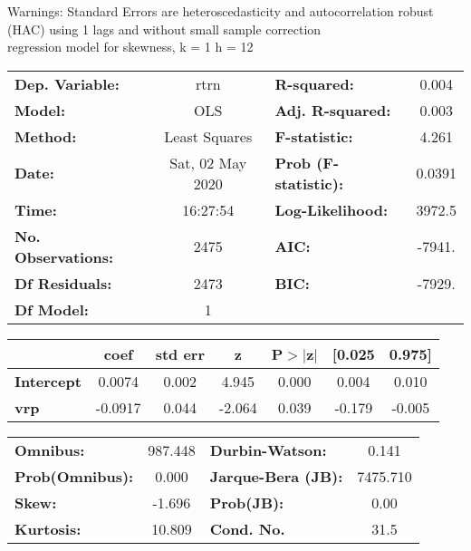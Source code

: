 Warnings: \newline
 [1] Standard Errors are heteroscedasticity and autocorrelation robust (HAC) using 1 lags and without small sample correction\\ 

regression model for skewness, k = 1 h = 12\begin{center}
\begin{tabular}{lclc}
\toprule
\textbf{Dep. Variable:}    &       rtrn       & \textbf{  R-squared:         } &     0.004   \\
\textbf{Model:}            &       OLS        & \textbf{  Adj. R-squared:    } &     0.003   \\
\textbf{Method:}           &  Least Squares   & \textbf{  F-statistic:       } &     4.261   \\
\textbf{Date:}             & Sat, 02 May 2020 & \textbf{  Prob (F-statistic):} &   0.0391    \\
\textbf{Time:}             &     16:27:54     & \textbf{  Log-Likelihood:    } &    3972.5   \\
\textbf{No. Observations:} &        2475      & \textbf{  AIC:               } &    -7941.   \\
\textbf{Df Residuals:}     &        2473      & \textbf{  BIC:               } &    -7929.   \\
\textbf{Df Model:}         &           1      & \textbf{                     } &             \\
\bottomrule
\end{tabular}
\begin{tabular}{lcccccc}
                   & \textbf{coef} & \textbf{std err} & \textbf{z} & \textbf{P$> |$z$|$} & \textbf{[0.025} & \textbf{0.975]}  \\
\midrule
\textbf{Intercept} &       0.0074  &        0.002     &     4.945  &         0.000        &        0.004    &        0.010     \\
\textbf{vrp}       &      -0.0917  &        0.044     &    -2.064  &         0.039        &       -0.179    &       -0.005     \\
\bottomrule
\end{tabular}
\begin{tabular}{lclc}
\textbf{Omnibus:}       & 987.448 & \textbf{  Durbin-Watson:     } &    0.141  \\
\textbf{Prob(Omnibus):} &   0.000 & \textbf{  Jarque-Bera (JB):  } & 7475.710  \\
\textbf{Skew:}          &  -1.696 & \textbf{  Prob(JB):          } &     0.00  \\
\textbf{Kurtosis:}      &  10.809 & \textbf{  Cond. No.          } &     31.5  \\
\bottomrule
\end{tabular}
\end{center}

